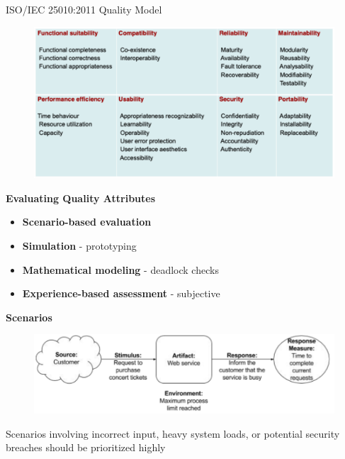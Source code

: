 ISO/IEC 25010:2011 Quality Model

\begin{figure}[ht!]
\centering
\includegraphics[width=\textwidth]{oborove/SWA/img/ieee_quality.png}
\end{figure}

\textbf{Evaluating Quality Attributes}
\begin{itemize}
    \item \textbf{Scenario-based evaluation}
    \item \textbf{Simulation} - prototyping
    \item \textbf{Mathematical modeling} - deadlock checks
    \item \textbf{Experience-based assessment} - subjective
\end{itemize}

\pagebreak
\textbf{Scenarios}
\begin{figure}[ht!]
\centering
\includegraphics[width=\textwidth]{oborove/SWA/img/scenarios.png}
\end{figure}

Scenarios involving incorrect input, heavy system loads, or potential security breaches should be prioritized highly

